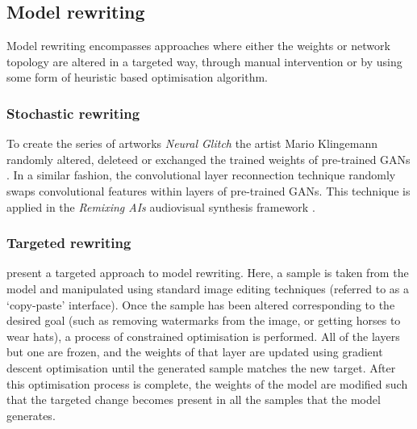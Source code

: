 \subsection{Model rewriting}
\label{survey:rewriting}

Model rewriting encompasses approaches where either the weights or network topology are altered in a targeted way, through manual intervention or by using some form of heuristic based optimisation algorithm. 

\subsubsection{Stochastic rewriting} 

To create the series of artworks \textit{Neural Glitch} the artist Mario Klingemann randomly altered, deleteed or exchanged the trained weights of pre-trained GANs \citep{klingemann2018neural}. 
In a similar fashion, the convolutional layer reconnection technique \citep{ruzika2020gan} randomly swaps convolutional features within layers of pre-trained GANs. 
This technique is applied in the \textit{Remixing AIs} audiovisual synthesis framework \citep{collins2020remixing}.

\subsubsection{Targeted rewriting} 
\citet{bau2020rewriting} present a targeted approach to model rewriting. 
Here, a sample is taken from the model and manipulated using standard image editing techniques (referred to as a `copy-paste' interface). 
Once the sample has been altered corresponding to the desired goal (such as removing watermarks from the image, or getting horses to wear hats), a process of constrained optimisation is performed. 
All of the layers but one are frozen, and the weights of that layer are updated using gradient descent optimisation until the generated sample matches the new target. 
After this optimisation process is complete, the weights of the model are modified such that the targeted change becomes present in all the samples that the model generates.

